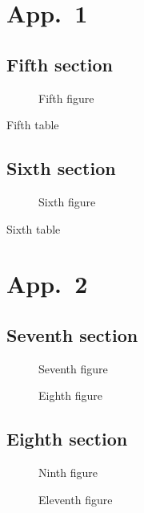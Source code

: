 \documentclass[12pt,a4paper]{report}
\begin{document}
\appendix
\chapter{App.~1}
\minitoc
\mtcskip
\minilof
\mtcskip
\minilot
\section{Fifth section}

\begin{figure}
\caption{Fifth figure}
\end{figure}
\begin{table}
\caption{Fifth table}
\end{table}

\section{Sixth section}

\begin{figure}
\caption{Sixth figure}
\end{figure}
\begin{table}
\caption{Sixth table}
\end{table}
\chapter{App.~2}
\minitoc
\mtcskip
\minilof
\mtcskip
\minilot
\section{Seventh section}
\begin{figure}
\caption{Seventh figure}
\end{figure}
\begin{figure}
\caption{Eighth figure}
\end{figure}

\section{Eighth section}

\begin{figure}
\caption{Ninth figure}
\end{figure}
\begin{figure}
\caption{Eleventh figure}
\end{figure}
\end{document}
